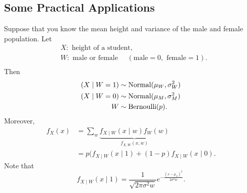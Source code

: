 \subsection{Some Practical Applications}
\begin{eg}[Height]
Suppose that you know the mean height and variance of the male and female population. Let 
\begin{align*}
    &X: \text{ height of a student}, \\
    &W: \text{ male or female } \quad (\text{male}=0, \text{ female}=1). \\
\end{align*}
Then
\begin{align*}
    (X\mid W=1) &\sim \operatorname*{Normal}(\mu_W,\sigma^2_W) \\
    (X\mid W=0) &\sim \operatorname*{Normal}(\mu_M, \sigma^2_M) \\
    W&\sim \operatorname*{Bernoulli}(p).
\end{align*}
Moreover,
\begin{align*}
    f_X(x)&=\sum_w \underbrace{f_{X\mid W}(x\mid w) f_W(w)}_{f_{X,W}(x,w)}\\
    &= p(f_{X\mid W}(x\mid 1)+(1-p)f_{X\mid W}(x\mid 0).
\end{align*}
Note that 
$$f_{X\mid W}(x\mid 1)=\frac{1}{\sqrt{2\pi\sigma^2 w}}e^{-\frac{(x-\mu_w)^2}{2\sigma^2w}}.$$
\end{eg}

